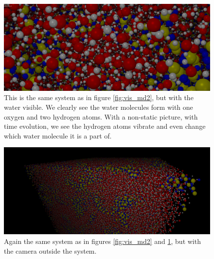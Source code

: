 \begin{figure}[htb]
\begin{center}
\includegraphics[width=\textwidth, trim=0cm 0cm 0cm 0cm, clip]{visualization/figures/md2.png}
\end{center}
\caption{This is the same system as in figure \ref{fig:vis_md2}, but with the water visible. We clearly see the water molecules form with one oxygen and two hydrogen atoms. With a non-static picture, with time evolution, we see the hydrogen atoms vibrate and even change which water molecule it is a part of. }
\label{fig:vis_md3}
\end{figure}

\begin{figure}[htb]
\begin{center}
\includegraphics[width=\textwidth, trim=0cm 0cm 0cm 0cm, clip]{visualization/figures/md3.png}
\end{center}
\caption{Again the same system as in figures \ref{fig:vis_md2} and \ref{fig:vis_md3}, but with the camera outside the system. }
\label{fig:vis_md4}
\end{figure}